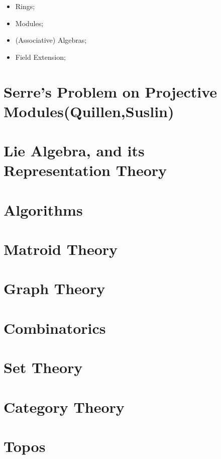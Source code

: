 \documentclass{ModulEN}
\begin{document}
		\begin{itemize}
			\item Rings;
			\item Modules;
			\item (Associative) Algebras;
			\item Field Extension;
		\end{itemize}
		
		
		
		
	\part{Serre's Problem on Projective Modules(Quillen,Suslin)}	
	
		
	\part{Lie Algebra, and its Representation Theory}
		
	
	\part{Algorithms}
	
	\part{Matroid Theory}
	
	\part{Graph Theory}
	
		
	
	\part{Combinatorics}
	
	\part{Set Theory}
	
	\part{Category Theory}
	
		
		
	\part{Topos}
	
\end{document}
